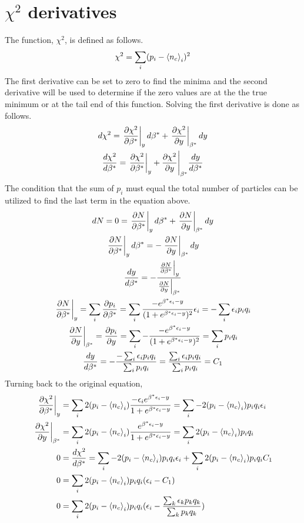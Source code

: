 \chapter{$\chi^2$ derivatives}
The function, $\chi^2$, is defined as follows.
\begin{equation}
\chi^2=\sum_i(p_i-\left<{n_c}\right>_i)^2
\end{equation}
The first derivative can be set to zero to find the minima and the second derivative will be used to determine if the zero values are at the the true minimum or at the tail end of this function. Solving the first derivative is done as follows.
\begin{gather}
    d\chi^2=\eval{\frac{\partial \chi^2}{\partial \beta^*}}_y d \beta^* 
    +\eval{\frac{\partial \chi^2}{\partial y}}_{\beta^*} d y\\    
    \frac{d\chi^2}{d\beta^*}=\eval{\frac{\partial \chi^2}{\partial 
    \beta^*}}_y +\frac{\partial \chi^2}{\partial y}\Biggr|_{\beta^*} 
    \frac{d y}{d \beta^*}
\end{gather}
The condition that the sum of $p_i$ must equal the total number of particles can be utilized to find the last term in the equation above. 
\begin{gather}
    dN=0=\eval{\frac{\partial N}{\partial \beta^*}}_y d \beta^* +\eval{\frac{\partial N}{\partial y}}_{\beta^*} d y\\
    \eval{\frac{\partial N}{\partial \beta^*}}_y d \beta^*=-\eval{\frac{\partial N}{\partial y}}_{\beta^*} d y\nonumber\\
    \frac{d y}{d \beta^*}=-\frac{\eval{\frac{\partial N}{\partial \beta^*}}_y}{\eval{\frac{\partial N}{\partial y}}_{\beta^*}}\\
    \eval{\frac{\partial N}{\partial \beta^*}}_y= \sum_i \frac{\partial p_i}{\partial \beta^*}=\sum_i \frac{-e^{\beta^* \epsilon_i-y}}{(1+e^{\beta^* \epsilon_i-y})^2}\epsilon_i=-\sum_i \epsilon_i p_i q_i\\
    \eval{\frac{\partial N}{\partial y}}_{\beta^*}=\frac{\partial p_i}{\partial y}=\sum_i -\frac{-e^{\beta^* \epsilon_i-y}}{(1+e^{\beta^* \epsilon_i-y})^2}=\sum_i p_i q_i\\
    \frac{d y}{d \beta^*}=-\frac{-\sum_i \epsilon_i p_i q_i}{\sum_i p_i q_i}=\frac{\sum_i \epsilon_i p_i q_i}{\sum_i p_i q_i}=C_1
\end{gather}
Turning back to the original equation, 
\begin{align}
    \eval{\frac{\partial \chi^2}{\partial \beta^*}}_y&=\sum_i 2(p_i-\avg{n_c}_i) \frac{-\epsilon_i e^{\beta^* \epsilon_i-y}}{1+e^{\beta^* \epsilon_i-y}}=\sum_i -2(p_i-\avg{n_c}_i)p_i q_i \epsilon_i\\
    \eval{\frac{\partial \chi^2}{\partial y}}_{\beta^*}&=\sum_i 2(p_i-\avg{n_c}_i) \frac{e^{\beta^* \epsilon_i-y}}{1+e^{\beta^* \epsilon_i-y}}=\sum_i 2(p_i-\avg{n_c}_i)p_i q_i\\
    0&=\frac{d\chi^2}{d\beta^*}=\sum_i -2(p_i-\avg{n_c}_i)p_i q_i \epsilon_i+\sum_i 2(p_i-\avg{n_c}_i)p_i q_i C_1\nonumber\\
    0&=\sum_i 2(p_i-\avg{n_c}_i)p_i q_i (\epsilon_i-C_1)\nonumber\\
    0&=\sum_i 2(p_i-\avg{n_c}_i)p_i q_i (\epsilon_i-\frac{\sum_k \epsilon_k p_k q_k}{\sum_k p_k q_k} )
\end{align}
